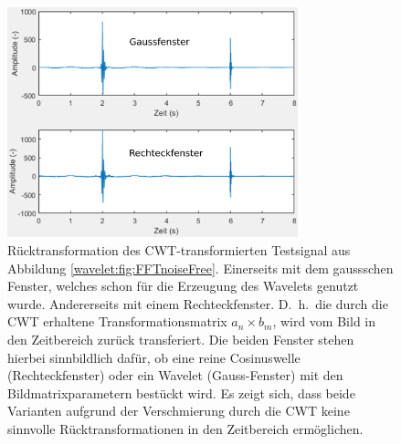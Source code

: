 \begin{figure}
	\centering
	\includegraphics[width=0.75\textwidth]{papers/wavelets/images/19-1_ICWT.png}
	\caption{Rücktransformation des CWT-transformierten Testsignal
	aus Abbildung \ref{wavelet:fig:FFTnoiseFree}.
	Einerseits mit dem gaussschen Fenster, welches schon für die Erzeugung
	des Wavelets genutzt wurde.
	Andererseits mit einem Rechteckfenster.
	D.~h.~die durch die CWT erhaltene Transformationsmatrix
	$a_n \times b_m$, wird vom Bild in den Zeitbereich zurück
	transferiert.
	Die beiden Fenster stehen hierbei sinnbildlich dafür, ob
	eine reine Cosinuswelle (Rechteckfenster) oder ein Wavelet
	(Gauss-Fenster) mit den Bildmatrixparametern bestückt wird.
	Es zeigt sich, dass beide Varianten aufgrund der Verschmierung
	durch die CWT keine sinnvolle Rücktransformationen in den
	Zeitbereich ermöglichen.}
	\label{wavelet:fig:ICWT}
\end{figure}
